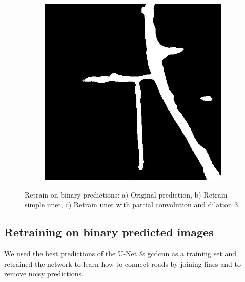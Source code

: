 \begin{figure}
\begin{subfigure}[b]{0.3\linewidth}
    \caption{}
  \end{subfigure}
     \begin{subfigure}[b]{0.3\linewidth}
     \includegraphics[width=\linewidth]{images/pred_190_pconv_dil3.jpg}
     \caption{}
   \end{subfigure}
  

  \caption{Retrain on binary predictions: 
  a) Original prediction, b) Retrain simple \acrshort{unet},
  c) Retrain \acrshort{unet} with partial convolution and dilation 3.
  }
  \label{fig:postprocessing}
  \vspace{-7mm}
\end{figure}


\subsection{Retraining on binary predicted images} \label{subsec:binary_retraining}
We used the best predictions of the U-Net \& \acrshort{gcdcnn} as a training set and retrained the network to learn how to connect roads by joining lines and to remove noisy predictions.

